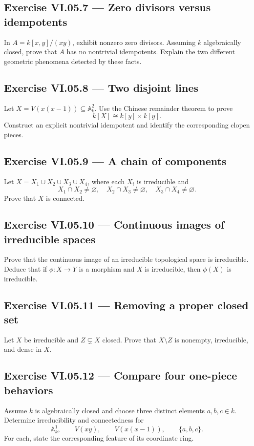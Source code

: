 \subsection*{Exercise VI.05.7 --- Zero divisors versus idempotents}
\label{ex:vi05-7}
In \(A=k[x,y]/(xy)\), exhibit nonzero zero divisors.  Assuming \(k\) algebraically closed,
prove that \(A\) has no nontrivial idempotents.  Explain the two different geometric
phenomena detected by these facts.

\subsection*{Exercise VI.05.8 --- Two disjoint lines}
\label{ex:vi05-8}
Let \(X=V(x(x-1))\subseteq\mathbb A_k^2\).  Use the Chinese remainder theorem to prove
\[
k[X]\cong k[y]\times k[y].
\]
Construct an explicit nontrivial idempotent and identify the corresponding clopen pieces.

\subsection*{Exercise VI.05.9 --- A chain of components}
\label{ex:vi05-9}
Let \(X=X_1\cup X_2\cup X_3\cup X_4\), where each \(X_i\) is irreducible and
\[
X_1\cap X_2\neq\varnothing,\quad
X_2\cap X_3\neq\varnothing,\quad
X_3\cap X_4\neq\varnothing.
\]
Prove that \(X\) is connected.

\subsection*{Exercise VI.05.10 --- Continuous images of irreducible spaces}
\label{ex:vi05-10}
Prove that the continuous image of an irreducible topological space is irreducible.  Deduce
that if \(\phi:X\to Y\) is a morphism and \(X\) is irreducible, then
\(\overline{\phi(X)}\) is irreducible.

\subsection*{Exercise VI.05.11 --- Removing a proper closed set}
\label{ex:vi05-11}
Let \(X\) be irreducible and \(Z\subsetneq X\) closed.  Prove that \(X\setminus Z\) is
nonempty, irreducible, and dense in \(X\).

\subsection*{Exercise VI.05.12 --- Compare four one-piece behaviors}
\label{ex:vi05-12}
Assume \(k\) is algebraically closed and choose three distinct elements \(a,b,c\in k\).
Determine irreducibility and connectedness for
\[
\mathbb A_k^1,\qquad V(xy),\qquad V(x(x-1)),\qquad \{a,b,c\}.
\]
For each, state the corresponding feature of its coordinate ring.

